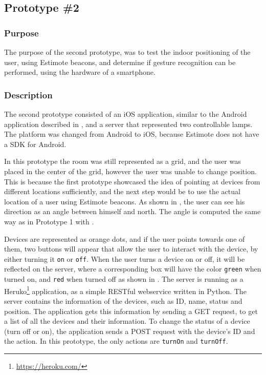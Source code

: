 \subsection{Prototype \#2}
\label{sec:implementation:prototypes:prototype2}
\subsubsection{Purpose}
The purpose of the second prototype, 
was to test the indoor positioning of the user, 
using Estimote beacons, 
and determine if gesture recognition can be performed, 
using the hardware of a smartphone.

\subsubsection{Description}
The second prototype consisted of an iOS application, 
similar to the Android application described in , 
and a server that represented two controllable lamps.
The platform was changed from Android to iOS, 
because Estimote does not have a SDK for Android.

In this prototype the room was still represented as a grid, 
and the user was placed in the center of the grid, 
however the user was unable to change position.
This is because the first prototype showcased the idea of pointing at devices from different locations sufficiently, 
and the next step would be to use the actual location of a user using Estimote beacons.
As shown in , 
the user can see his direction as an angle between himself and north.
The angle is computed the same way as in Prototype 1 with .

Devices are represented as orange dots, 
and if the user points towards one of them, 
two buttons will appear that allow the user to interact with the device, 
by either turning it \texttt{on} or \texttt{off}.
When the user turns a device on or off, 
it will be reflected on the server, 
where a corresponding box will have the color \texttt{green} when turned on, 
and \texttt{red} when turned off as shown in .
The server is running as a Heruko\footnote{\url{https://heroku.com/}} application, 
as a simple RESTful webservice written in Python. 
The server contains the information of the devices, 
such as ID, name, status and position.
The application gets this information by sending a GET request, 
to get a list of all the devices and their information. 
To change the status of a device (turn off or on), 
the application sends a POST request with the device's ID and the action. 
In this prototype, the only actions are \texttt{turnOn} and \texttt{turnOff}.

